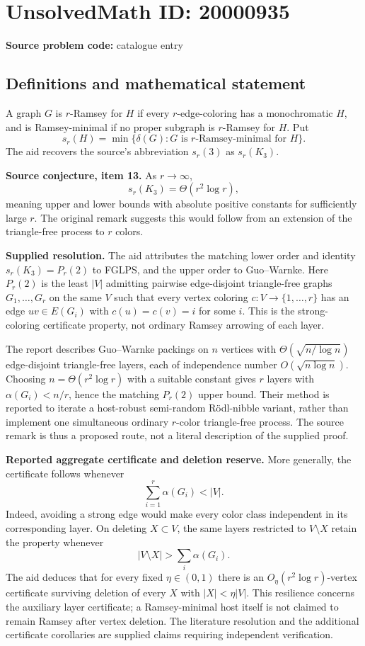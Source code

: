 \documentclass[11pt]{article}
\begin{document}
\section*{UnsolvedMath ID: 20000935}
\textbf{Source problem code:} catalogue entry
\subsection{Definitions and mathematical statement}
A graph $G$ is $r$-Ramsey for $H$ if every $r$-edge-coloring has a monochromatic $H$, and is Ramsey-minimal if no proper subgraph is $r$-Ramsey for $H$. Put
\[
 s_r(H)=\min\{\delta(G):G\text{ is }r\text{-Ramsey-minimal for }H\}.
\]
The aid recovers the source's abbreviation $s_r(3)$ as $s_r(K_3)$.

\textbf{Source conjecture, item 13.} As $r\to\infty$,
\[
 s_r(K_3)=\Theta(r^2\log r),
\]
meaning upper and lower bounds with absolute positive constants for sufficiently large $r$. The original remark suggests this would follow from an extension of the triangle-free process to $r$ colors.

\textbf{Supplied resolution.} The aid attributes the matching lower order and identity $s_r(K_3)=P_r(2)$ to FGLPS, and the upper order to Guo--Warnke. Here $P_r(2)$ is the least $|V|$ admitting pairwise edge-disjoint triangle-free graphs $G_1,\ldots,G_r$ on the same $V$ such that every vertex coloring $c:V\to\{1,\ldots,r\}$ has an edge $uv\in E(G_i)$ with $c(u)=c(v)=i$ for some $i$. This is the strong-coloring certificate property, not ordinary Ramsey arrowing of each layer.

The report describes Guo--Warnke packings on $n$ vertices with $\Theta(\sqrt{n/\log n})$ edge-disjoint triangle-free layers, each of independence number $O(\sqrt{n\log n})$. Choosing $n=\Theta(r^2\log r)$ with a suitable constant gives $r$ layers with $\alpha(G_i)<n/r$, hence the matching $P_r(2)$ upper bound. Their method is reported to iterate a host-robust semi-random R\"odl-nibble variant, rather than implement one simultaneous ordinary $r$-color triangle-free process. The source remark is thus a proposed route, not a literal description of the supplied proof.

\textbf{Reported aggregate certificate and deletion reserve.} More generally, the certificate follows whenever
\[
 \sum_{i=1}^r\alpha(G_i)<|V|.
\]
Indeed, avoiding a strong edge would make every color class independent in its corresponding layer. On deleting $X\subset V$, the same layers restricted to $V\setminus X$ retain the property whenever
\[
 |V\setminus X|>\sum_i\alpha(G_i).
\]
The aid deduces that for every fixed $\eta\in(0,1)$ there is an $O_\eta(r^2\log r)$-vertex certificate surviving deletion of every $X$ with $|X|<\eta|V|$. This resilience concerns the auxiliary layer certificate; a Ramsey-minimal host itself is not claimed to remain Ramsey after vertex deletion. The literature resolution and the additional certificate corollaries are supplied claims requiring independent verification.
\end{document}
